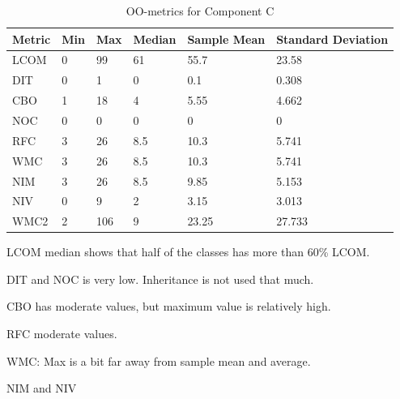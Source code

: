 \begin{table}[]
\centering
\caption{OO-metrics for Component C}
\label{tab:oometrics-config}
\begin{tabular}{|l|l|l|l|l|l|}
\hline
\textbf{Metric} & \textbf{Min} & \textbf{Max} & \textbf{Median} & \textbf{Sample Mean} & \textbf{Standard Deviation} \\ \hline
LCOM            & 0            & 99           & 61              & 55.7                 & 23.58                       \\ \hline
DIT             & 0            & 1            & 0               & 0.1                  & 0.308                       \\ \hline
CBO             & 1            & 18           & 4               & 5.55                 & 4.662                       \\ \hline
NOC             & 0            & 0            & 0               & 0                    & 0                           \\ \hline
RFC             & 3            & 26           & 8.5             & 10.3                 & 5.741                       \\ \hline
WMC             & 3            & 26           & 8.5             & 10.3                 & 5.741                       \\ \hline
NIM             & 3            & 26           & 8.5             & 9.85                 & 5.153                       \\ \hline
NIV             & 0            & 9            & 2               & 3.15                 & 3.013                       \\ \hline
WMC2            & 2            & 106          & 9              & 23.25                 & 27.733                      \\ \hline
\end{tabular}
\end{table}

LCOM median shows that half of the classes has more than 60\% LCOM. 

DIT and NOC is very low. Inheritance is not used that much. 

CBO has moderate values, but maximum value is relatively high. 

RFC moderate values.

WMC: Max is a bit far away from sample mean and average.

NIM and NIV






